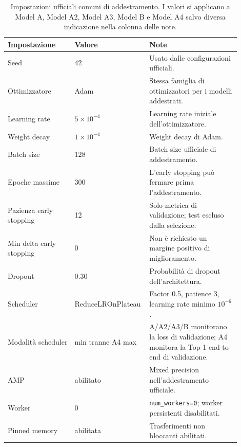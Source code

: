 \begin{table}[H]
\centering
\small
\caption{Impostazioni ufficiali comuni di addestramento.  I valori si applicano a Model A, Model A2, Model A3, Model B e Model A4 salvo diversa indicazione nella colonna delle note.}
\label{tab:shared-training-settings}
\begin{tabular}{p{0.28\linewidth}p{0.24\linewidth}p{0.38\linewidth}}
\toprule
Impostazione & Valore & Note \\
\midrule
Seed & 42 & Usato dalle configurazioni ufficiali. \\
Ottimizzatore & Adam & Stessa famiglia di ottimizzatori per i modelli addestrati. \\
Learning rate & \(5\times10^{-4}\) & Learning rate iniziale dell'ottimizzatore. \\
Weight decay & \(1\times10^{-4}\) & Weight decay di Adam. \\
Batch size & 128 & Batch size ufficiale di addestramento. \\
Epoche massime & 300 & L'early stopping può fermare prima l'addestramento. \\
Pazienza early stopping & 12 & Solo metrica di validazione; test escluso dalla selezione. \\
Min delta early stopping & 0 & Non è richiesto un margine positivo di miglioramento. \\
Dropout & 0.30 & Probabilità di dropout dell'architettura. \\
Scheduler & ReduceLROnPlateau & Factor 0.5, patience 3, learning rate minimo \(10^{-6}\). \\
Modalità scheduler & min tranne A4 max & A/A2/A3/B monitorano la loss di validazione; A4 monitora la Top-1 end-to-end di validazione. \\
AMP & abilitato & Mixed precision nell'addestramento ufficiale. \\
Worker & 0 & \texttt{num\_workers=0}; worker persistenti disabilitati. \\
Pinned memory & abilitata & Trasferimenti non bloccanti abilitati. \\
\bottomrule
\end{tabular}
\end{table}
